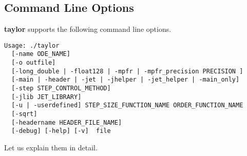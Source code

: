 \documentclass[10pt]{article}
\theoremstyle{remark}
\newcommand{\taylorname}{{\bf taylor}}
\begin{document}
\subsection{Command Line Options}\label{sec:clo}

\taylorname{} supports the following command line options.
\begin{verbatim}
Usage: ./taylor 
  [-name ODE_NAME]
  [-o outfile] 
  [-long_double | -float128 | -mpfr | -mpfr_precision PRECISION ]
  [-main | -header | -jet | -jhelper | -jet_helper | -main_only] 
  [-step STEP_CONTROL_METHOD]
  [-jlib JET_LIBRARY]
  [-u | -userdefined] STEP_SIZE_FUNCTION_NAME ORDER_FUNCTION_NAME 
  [-sqrt]
  [-headername HEADER_FILE_NAME]
  [-debug] [-help] [-v]  file
\end{verbatim}

Let us explain them in detail.
\end{document}
